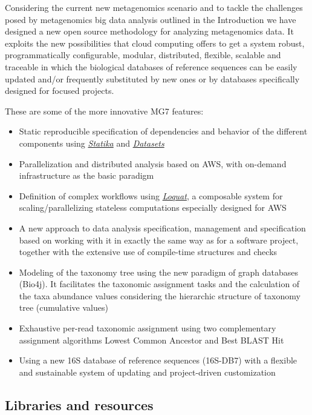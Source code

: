 \documentclass[fleqn,10pt,lineno]{wlpeerj}
\providecommand{\tightlist}{%
\setlength{\itemsep}{0pt}\setlength{\parskip}{0pt}}
\begin{document}
Considering the current new metagenomics scenario and to tackle the
challenges posed by metagenomics big data analysis outlined in the
Introduction we have designed a new open source methodology for
analyzing metagenomics data. It exploits the new possibilities that
cloud computing offers to get a system robust, programmatically
configurable, modular, distributed, flexible, scalable and traceable in
which the biological databases of reference sequences can be easily
updated and/or frequently substituted by new ones or by databases
specifically designed for focused projects.

These are some of the more innovative MG7 features:

\begin{itemize}
\tightlist
\item
  Static reproducible specification of dependencies and behavior of the
  different components using \emph{\protect\hyperlink{statika}{Statika}}
  and \emph{\protect\hyperlink{datasets}{Datasets}}
\item
  Parallelization and distributed analysis based on AWS, with on-demand
  infrastructure as the basic paradigm
\item
  Definition of complex workflows using
  \emph{\protect\hyperlink{loquat}{Loquat}}, a composable system for
  scaling/parallelizing stateless computations especially designed for
  AWS
\item
  A new approach to data analysis specification, management and
  specification based on working with it in exactly the same way as for
  a software project, together with the extensive use of compile-time
  structures and checks
\item
  Modeling of the taxonomy tree using the new paradigm of graph
  databases (Bio4j). It facilitates the taxonomic assignment tasks and
  the calculation of the taxa abundance values considering the
  hierarchic structure of taxonomy tree (cumulative values)
\item
  Exhaustive per-read taxonomic assignment using two complementary
  assignment algorithms Lowest Common Ancestor and Best BLAST Hit
\item
  Using a new 16S database of reference sequences (16S-DB7) with a
  flexible and sustainable system of updating and project-driven
  customization
\end{itemize}

\subsection{Libraries and resources}\label{libraries-and-resources}
\end{document}
